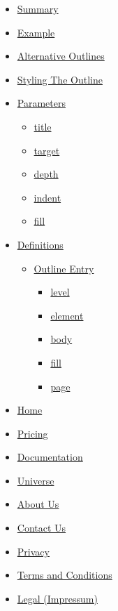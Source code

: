 \begin{itemize}
\tightlist
\item
  \hyperref[summary]{Summary}
\item
  \hyperref[example]{Example}
\item
  \hyperref[alternative-outlines]{Alternative Outlines}
\item
  \hyperref[styling-the-outline]{Styling The Outline}
\item
  \hyperref[parameters]{Parameters}

  \begin{itemize}
  \tightlist
  \item
    \hyperref[parameters-title]{title}
  \item
    \hyperref[parameters-target]{target}
  \item
    \hyperref[parameters-depth]{depth}
  \item
    \hyperref[parameters-indent]{indent}
  \item
    \hyperref[parameters-fill]{fill}
  \end{itemize}
\item
  \hyperref[definitions]{Definitions}

  \begin{itemize}
  \tightlist
  \item
    \hyperref[definitions-entry]{Outline Entry}

    \begin{itemize}
    \tightlist
    \item
      \hyperref[definitions-entry-level]{level}
    \item
      \hyperref[definitions-entry-element]{element}
    \item
      \hyperref[definitions-entry-body]{body}
    \item
      \hyperref[definitions-entry-fill]{fill}
    \item
      \hyperref[definitions-entry-page]{page}
    \end{itemize}
  \end{itemize}
\end{itemize}

\begin{itemize}
\tightlist
\item
  \href{/}{Home}
\item
  \href{/pricing/}{Pricing}
\item
  \href{/docs/}{Documentation}
\item
  \href{/universe/}{Universe}
\item
  \href{/about/}{About Us}
\item
  \href{/contact/}{Contact Us}
\item
  \href{/privacy/}{Privacy}
\item
  \href{https://typst.app/terms}{Terms and Conditions}
\item
  \href{/legal/}{Legal (Impressum)}
\end{itemize}

